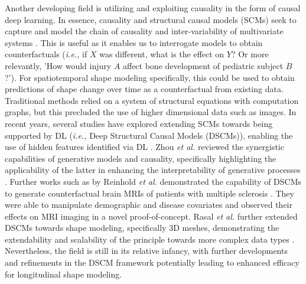 		Another developing field is utilizing and exploiting causality in the form of causal deep learning. In essence, causality and structural causal models (SCMs) seek to capture and model the chain of causality and inter-variability of multivariate systems \cite{peters2017elements, Pearl2013, pearl2016causal}. This is useful as it enables us to interrogate models to obtain counterfactuals (\textit{i.e.,} if $X$ was different, what is the effect on $Y$? Or more relevantly, 'How would injury $A$ affect bone development of pediatric subject $B$?'). For spatiotemporal shape modeling specifically, this could be used to obtain predictions of shape change over time as a counterfactual from existing data. Traditional methods relied on a system of structural equations with computation graphs, but this precluded the use of higher dimensional data such as images. In recent years, several studies have explored extending SCMs towards being supported by DL (\textit{i.e.,} Deep Structural Causal Models (DSCMs)), enabling the use of hidden features identified via DL \cite{Lore2018, kjsadflkjaslkdjfsdf, heeeeeeeeeeeeeeeeeeeee}. Zhou \textit{et al.} reviewed the synergistic capabilities of generative models and causality, specifically highlighting the applicability of the latter in enhancing the interpretability of generative processes \cite{hehehehehehehhehehehe}. Further works such as by Reinhold \textit{et al.} demonstrated the capability of DSCMs to generate counterfactual brain MRIs of patients with multiple sclerosis \cite{Reinhold2021}. They were able to manipulate demographic and disease covariates and observed their effects on MRI imaging in a novel proof-of-concept. Rasal \textit{et al.} further extended DSCMs towards shape modeling, specifically 3D meshes, demonstrating the extendability and scalability of the principle towards more complex data types \cite{Rasal2022}. Nevertheless, the field is still in its relative infancy, with further developments and refinements in the DSCM framework potentially leading to enhanced efficacy for longitudinal shape modeling. 

